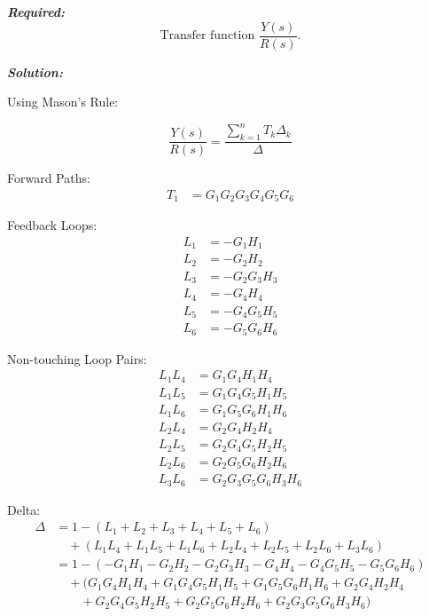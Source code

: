 ﻿\documentclass[11pt]{article}
\begin{document}
\vspace{12pt}

\noindent\textbf{\textit{Required:}}
\[
\text{Transfer function } \frac{Y(s)}{R(s)}.
\]

\vspace{12pt}

\noindent \textbf{\textit{Solution:}}

\vspace{2pt}
{Using Mason's Rule:}

\[
\frac{Y(s)}{R(s)} = \frac{\sum_{k=1}^{n} T_k \Delta_k}{\Delta}
\]

Forward Paths:
\begin{align*}
T_1 &= G_1 G_2 G_3 G_4 G_5 G_6
\end{align*}

\vspace{0.5em}

Feedback Loops:
\begin{align*}
L_1 &= -G_1 H_1 \\
L_2 &= -G_2 H_2 \\
L_3 &= -G_2 G_3 H_3 \\
L_4 &= -G_4 H_4 \\
L_5 &= -G_4 G_5 H_5 \\
L_6 &= -G_5 G_6 H_6
\end{align*}

\vspace{0.5em}

Non-touching Loop Pairs:
\begin{align*}
L_1 L_4 &= G_1 G_4 H_1 H_4 \\
L_1 L_5 &= G_1 G_4 G_5 H_1 H_5 \\
L_1 L_6 &= G_1 G_5 G_6 H_1 H_6 \\
L_2 L_4 &= G_2 G_4 H_2 H_4 \\
L_2 L_5 &= G_2 G_4 G_5 H_2 H_5 \\
L_2 L_6 &= G_2 G_5 G_6 H_2 H_6 \\
L_3 L_6 &= G_2 G_3 G_5 G_6 H_3 H_6
\end{align*}

\vspace{0.5em}

Delta:
{\small
\begin{align*}
\Delta &= 1 - (L_1 + L_2 + L_3 + L_4 + L_5 + L_6) \\
&\quad + (L_1 L_4 + L_1 L_5 + L_1 L_6 + L_2 L_4 + L_2 L_5 + L_2 L_6 + L_3 L_6) \\
       &= 1 - (-G_1 H_1 - G_2 H_2 - G_2 G_3 H_3 - G_4 H_4 - G_4 G_5 H_5 - G_5 G_6 H_6) \\
       &\quad + (G_1 G_4 H_1 H_4 + G_1 G_4 G_5 H_1 H_5 + G_1 G_5 G_6 H_1 H_6 + G_2 G_4 H_2 H_4 \\
       &\quad \quad + G_2 G_4 G_5 H_2 H_5 + G_2 G_5 G_6 H_2 H_6 + G_2 G_3 G_5 G_6 H_3 H_6)
\end{align*}
}
\end{document}
